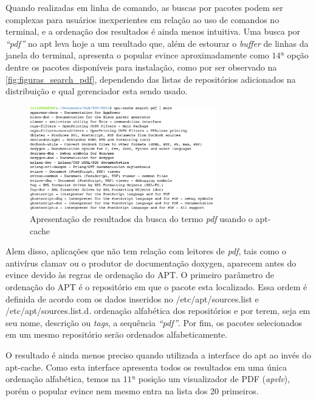 Quando realizadas em linha de comando, as buscas por pacotes podem ser complexas para usuários inexperientes em relação ao uso de comandos no terminal, e a ordenação dos resultados é ainda menos intuitiva. Uma busca por \textit{``pdf''} no {\code apt} leva hoje a um resultado que, além de estourar o \textit{buffer} de linhas da janela do terminal, apresenta o popular {\code evince} aproximadamente como $14ª$ opção dentre os  pacotes disponíveis para instalação, como por ser observado na \autoref{fig:figuras_search_pdf}, dependendo das listas de repositórios adicionados na distribuição e qual gerenciador esta sendo usado.

\begin{figure}[h]
  \centering
	\includegraphics[width=0.72\textwidth]{figuras/search_pdf}
  \caption{Apresentação de resultados da busca do termo \textit{pdf} usando o {\code apt-cache}}
  \label{fig:figuras_search_pdf}
\end{figure}

Alem disso, aplicações que não tem relação com leitores de \textit{pdf}, tais como o antivírus {\code clamav} ou o produtor de documentação {\code doxygen}, aparecem antes do {\code evince} devido às regras de ordenação do APT. O primeiro parâmetro de ordenação do APT é o repositório em que o pacote esta localizado. Essa ordem é definida de acordo com os dados inseridos no {\code /etc/apt/sources.list} e {\code /etc/apt/sources.list.d}.  ordenação alfabética dos repositórios e por terem, seja em seu nome, descrição ou \textit{tags}, a sequência \textit{``pdf''}. Por fim, os pacotes selecionados em um mesmo repositório serão ordenados alfabeticamente.

O resultado é ainda menos preciso quando utilizada a interface do {\code apt} ao invés do {\code apt-cache}. Como esta interface apresenta todos os resultados em uma única ordenação alfabética, temos na $11ª$ posição um visualizador de PDF (\textit{apvlv}), porém o popular {\code evince} nem mesmo entra na lista dos 20 primeiros.

